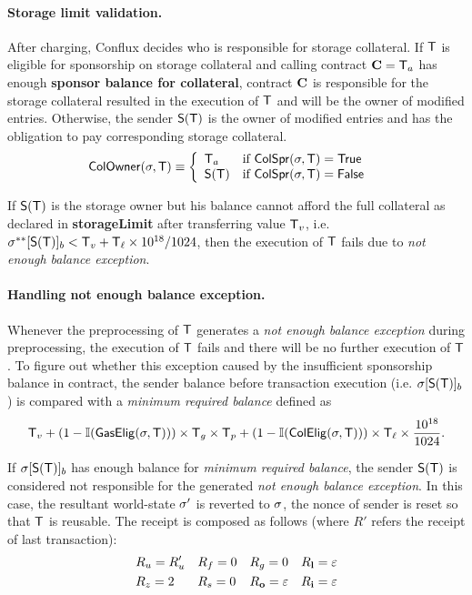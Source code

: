 \paragraph{Storage limit validation.}

After charging, Conflux decides who is responsible for storage collateral. If $\textsf{T}$ is eligible for sponsorship on storage collateral and calling contract $\mathbf{C}=\textsf{T}_a$ has enough \textbf{sponsor balance for collateral}, contract $\mathbf{C}$ is responsible for the storage collateral resulted in the execution of $\textsf{T}$ and will be the owner of modified entries. 
%
Otherwise, the sender $\mathsf{S}{\left({\textsf{T}} \right)}$ is the owner of modified entries
and has the obligation to pay corresponding storage collateral. 
%
\begin{align}
	\mathsf{ColOwner}(\mathbf{\sigma},\textsf{T}) &\equiv\left\{ \begin{array}{ll}
		\textsf{T}_a & \text{if } \mathsf{ColSpr}(\mathbf{\sigma},\textsf{T}) = \mathsf{True} \\ 
		\mathsf{S}{\left({\textsf{T}} \right)} & \text{if } \mathsf{ColSpr}(\mathbf{\sigma},\textsf{T}) = \mathsf{False} \\ 
	\end{array}\right.
\end{align}

If $\mathsf{S}{\left({\textsf{T}} \right)}$ is the storage owner but his balance cannot afford the full collateral as declared in {\bf storageLimit} after transferring value $\textsf{T}_v$, 
i.e. $\mathbf{\sigma}^{**}[\mathsf{S}{\left({\textsf{T}} \right)}]_b<\textsf{T}_v+\textsf{T}_\ell\times 10^{18}/1024$, 
then the execution of $\textsf{T}$ fails due to \emph{not enough balance exception}. 

\paragraph{Handling not enough balance exception.} 

Whenever the preprocessing of $\textsf{T}$ generates a \emph{not enough balance exception} during preprocessing, the execution of $\textsf{T}$ fails and there will be no further execution of $\textsf{T}$. To figure out whether this exception caused by the insufficient sponsorship balance in contract, the sender balance before transaction execution (i.e. $\mathbf{\sigma}[\mathsf{S}{\left({\textsf{T}} \right)}]_b$) is compared with a \emph{minimum required balance} defined as
\begin{align}
	\textsf{T}_v+(1-\mathbb{I}(\mathsf{GasElig}(\mathbf{\sigma},\textsf{T})))\times \textsf{T}_g \times \textsf{T}_p + (1-\mathbb{I}(\mathsf{ColElig}(\mathbf{\sigma},\textsf{T})))\times \textsf{T}_\ell \times \frac{10^{18}}{1024}.
\end{align}

If $\mathbf{\sigma}[\mathsf{S}{\left({\textsf{T}} \right)}]_b$ has enough balance for \emph{minimum required balance}, the sender $\mathsf{S}{\left({\textsf{T}} \right)}$ is considered not responsible for the generated \emph{not enough balance exception}. 
In this case, the resultant world-state $\mathbf{\sigma}'$ is reverted to $\mathbf{\sigma}$, the nonce of sender is reset so that $\textsf{T}$ is reusable. The receipt is composed as follows (where $R'$ refers the receipt of last transaction):
\begin{align}
	&R_u=R'_u && R_f=0 && R_g=0 && R_{\bf l}=\mathbb{\varepsilon} \\
	&R_z=2 && R_s=0 && R_{\bf o}=\mathbb{\varepsilon} && R_{\bf i}=\mathbb{\varepsilon}
\end{align}

